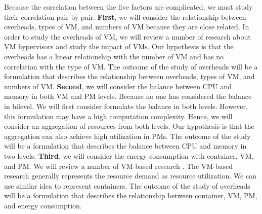 \begin{enumerate}
	 Because the correlation between the five factors are complicated, we must study their correlation pair by pair. 
	\textbf{First}, we will consider the relationship between overheads, types of VM, and numbers of VM because they are close related. In order to study the overheads of VM, we will review a number of research about VM hypervisors and study the impact of VMs. Our hypothesis is that the overheads has a linear relationship with the number of VM and has no correlation with the type of VM. The outcome of the study of overheads will be a formulation that describes the relationship between overheads, types of VM, and numbers of VM.
	\textbf{Second}, we will consider the balance between CPU and memory in both VM and PM levels. Because no one has considered the balance in bilevel. We 
	will first consider formulate the balance in both levels. However, this formulation may have a high computation complexity. Hence, we will consider an aggregation of resources from both levels. Our hypothesis is that the aggregation can also achieve high utilization in PMs. The outcome of the study will be a formulation that describes the balance between CPU and memory in two levels.
	\textbf{Third}, we will consider the energy consumption with container, 
	VM, and PM. We will review a number of VM-based research \cite{Ferdaus:2014ep, Xu:2010vh, Gao:2013gg}. 
	The VM-based research generally represents the resource demand as resource utilization. 
	We can use similar idea to represent containers. The outcome of the study of overheads will be a formulation that describes the relationship between container, VM, PM, and energy consumption.
	

\end{enumerate}

